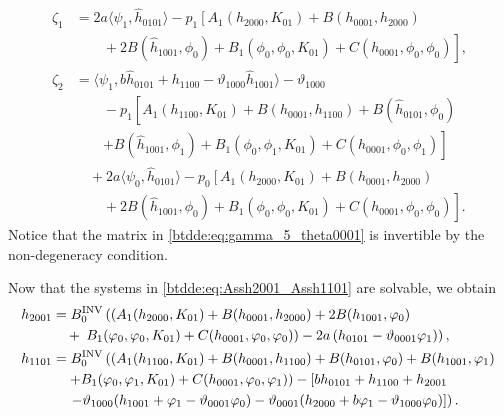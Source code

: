\begin{equation}
\label{btdde:eq:zeta1_zeta2}
\begin{aligned}
    \zeta_1 &=  2a\langle \psi_1, \hat h_{0101} \rangle - p_1 \left[   
			  A_1(h_{2000},K_{01}) + B(h_{0001},h_{2000}) \right.  \\
			& \left. \qquad + 2 B(\hat h_{1001},\phi_0)
			+ B_1(\phi_0,\phi_0,K_{01}) + C(h_{0001},\phi_0,\phi_0) \right], \\
    \zeta_2 &= \langle \psi_1, b\hat h_{0101} + h_{1100} - \vartheta_{1000}\hat h_{1001} \rangle - \vartheta_{1000}  \\
				& \qquad  - p_1 \left[ A_1(h_{1100},K_{01}) + 
				B(h_{0001},h_{1100}) + B(\hat h_{0101},\phi_0) \right. \\
				& \qquad \left. + B(\hat h_{1001},\phi_1) + B_1(\phi_0,\phi_1,K_{01})
				+ C(h_{0001},\phi_0,\phi_1) \right]  \\
                & \quad + 2a\langle \psi_0, \hat h_{0101} \rangle 
                - p_0 \left[ A_1(h_{2000},K_{01}) +
				B(h_{0001},h_{2000}) \right. \\
				& \qquad + \left. 2 B( \hat h_{1001},\phi_0) +
				B_1(\phi_0,\phi_0,K_{01}) + C(h_{0001},\phi_0,\phi_0) \right].
\end{aligned}
\end{equation}	
Notice that the matrix in \cref{btdde:eq:gamma_5_theta0001} is invertible by the
non-degeneracy condition. 

Now that the systems in \cref{btdde:eq:Assh2001_Assh1101} are
solvable, we obtain
\begin{equation}
\label{btdde:eq:h2001_h1101}
\begin{aligned}
h_{2001} &= B^{\mathrm{INV}}_{0} \left( \left(A_1(h_{2000},K_{01}) +B(h_{0001},h_{2000}) + 2 B(h_{1001},\varphi_0) \right.\right. \\
				& \quad + \left.\left. B_1(\varphi_0,\varphi_0,K_{01}) + C(h_{0001},\varphi_0,\varphi_0)\right) - 2 a \left( h_{0101} - \vartheta_{0001} \varphi_1\right)\right), \\
h_{1101} &= B^{\mathrm{INV}}_{0} \left( \left( A_1(h_{1100},K_{01}) + B(h_{0001},h_{1100}) + B(h_{0101},\varphi_0) + B(h_{1001},\varphi_1) \right.\right.  \\
				& \quad  \left. + B_1(\varphi_0,\varphi_1,K_{01}) + C(h_{0001},\varphi_0,\varphi_1) \right) - \left[b h_{0101} + h_{1100} + h_{2001} \right. \\
				& \quad \left.\left. - \vartheta_{1000} (h_{1001} + \varphi_1 - \vartheta_{0001} \varphi_0) 
                               - \vartheta_{0001} (h_{2000} + b \varphi_1 - \vartheta_{1000} \varphi_0)\right]\right).
\end{aligned}
\end{equation}

